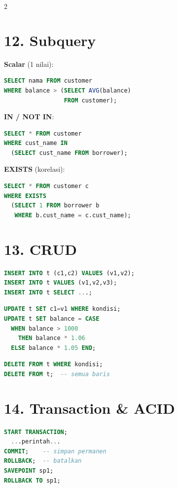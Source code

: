 \documentclass[10pt,a4paper]{article}
\begin{document}
\begin{multicols*}{2}
	\section*{12. Subquery}

	\textbf{Scalar} (1 nilai):
	\begin{lstlisting}[language=SQL]
SELECT nama FROM customer
WHERE balance > (SELECT AVG(balance)
                 FROM customer);
\end{lstlisting}

	\textbf{IN / NOT IN}:
	\begin{lstlisting}[language=SQL]
SELECT * FROM customer
WHERE cust_name IN
  (SELECT cust_name FROM borrower);
\end{lstlisting}

	\textbf{EXISTS} (korelasi):
	\begin{lstlisting}[language=SQL]
SELECT * FROM customer c
WHERE EXISTS
  (SELECT 1 FROM borrower b
   WHERE b.cust_name = c.cust_name);
\end{lstlisting}

	\section*{13. CRUD}

	\begin{lstlisting}[language=SQL]
INSERT INTO t (c1,c2) VALUES (v1,v2);
INSERT INTO t VALUES (v1,v2,v3);
INSERT INTO t SELECT ...;
\end{lstlisting}

	\begin{lstlisting}[language=SQL]
UPDATE t SET c1=v1 WHERE kondisi;
UPDATE t SET balance = CASE
  WHEN balance > 1000
    THEN balance * 1.06
  ELSE balance * 1.05 END;
\end{lstlisting}

	\begin{lstlisting}[language=SQL]
DELETE FROM t WHERE kondisi;
DELETE FROM t;  -- semua baris
\end{lstlisting}

	\section*{14. Transaction \& ACID}

	\begin{lstlisting}[language=SQL]
START TRANSACTION;
  ...perintah...
COMMIT;    -- simpan permanen
ROLLBACK;  -- batalkan
SAVEPOINT sp1;
ROLLBACK TO sp1;
\end{lstlisting}


\end{multicols*}
\end{document}
